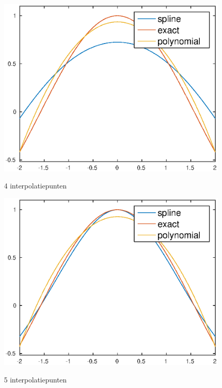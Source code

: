 \documentclass[]{article}
\begin{document}
\begin{figure}[h]
\centering
\begin{minipage}{0.5\textwidth}
\centering %
 \includegraphics[width=1\textwidth]{opgave2_N4.eps} 
   \label{opgave2_N4.eps}
\caption{4 interpolatiepunten}
\end{minipage}\hfill
\begin{minipage}{0.5\textwidth}
\centering
\includegraphics[width=1\textwidth]{opgave2_N5.eps}
 \label{opgave2_N5.eps}
\caption{5 interpolatiepunten}
\end{minipage}
\end{figure}
\end{document}
